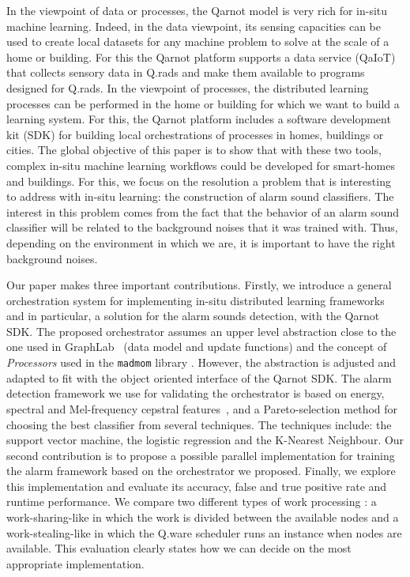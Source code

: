 \documentclass[10pt, conference, compsocconf]{IEEEtran}
\begin{document}
In the viewpoint of data or processes, the Qarnot model is very rich for in-situ machine learning. Indeed, in the data viewpoint, 
its sensing capacities can be used to create local datasets for any machine problem to solve at the scale of a home or building. 
For this the Qarnot platform supports a data service (QaIoT) that collects sensory data in Q.rads 
and make them available to programs designed for Q.rads. 
In the viewpoint of processes, the distributed learning processes can be performed in the home or building for which we want to 
build a learning system. For this, the Qarnot platform includes a software development kit (SDK) for building local orchestrations 
of processes in homes, buildings or cities.
The global objective of this paper is to show that with these two tools, 
complex in-situ machine learning workflows could be developed for smart-homes and buildings. For this, we focus on the resolution 
a problem that is interesting to address with in-situ learning: the construction of alarm sound classifiers. 
The interest in this problem comes from the fact that the behavior of an alarm sound classifier will be related to the background noises that 
it was trained with. Thus, depending on the environment in which we are, it is important to have the right background noises.

Our paper makes three important contributions. Firstly, we introduce a general orchestration system for implementing in-situ 
distributed learning frameworks and in particular, a solution for the alarm sounds detection, with the Qarnot SDK. 
The proposed orchestrator assumes an upper level abstraction close to the one used in GraphLab~\cite{Low:2012:DGF:2212351.2212354} (data model 
and update functions) and the concept of {\it Processors} used in the \texttt{madmom} library \cite{DBLP:journals/corr/BockKSKW16}. However, the abstraction is adjusted and adapted to fit with the object oriented interface 
of the Qarnot SDK. 
The alarm detection framework we use for validating the orchestrator is based on energy, spectral and Mel-frequency cepstral features~\cite{Davis:1990:CPR:108235.108239}, \cite{pyAudioAnalysis}
and a Pareto-selection method for choosing the best classifier from several techniques. %
The techniques include: the support vector machine, the logistic regression and the K-Nearest Neighbour. Our second contribution is to propose a possible parallel 
implementation for training the alarm framework based on the orchestrator we proposed. Finally, we explore this implementation and evaluate its accuracy, 
false and true positive rate and runtime performance. We compare two different types of work processing : a work-sharing-like in which the work is divided between the available nodes and a work-stealing-like in which the Q.ware scheduler runs an instance when nodes are available. This evaluation clearly states how we can decide on the most appropriate 
implementation. 
\end{document}
